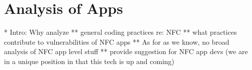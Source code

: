 \documentclass[12pt]{article}
\begin{document}
%
%
%
%
%

\section{Analysis of Apps}
* Intro: Why analyze
** general coding practices re: NFC
** what practices contribute to vulnerabilities of NFC apps
** As for as we know, no broad analysis of NFC app level stuff
** provide suggestion for NFC app devs (we are in a unique position in that this tech is up and coming)
\end{document}
